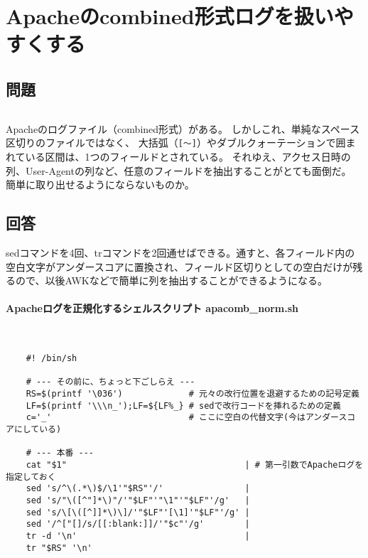 \section{Apacheのcombined形式ログを扱いやすくする}

\subsection*{問題}
\noindent
$\!\!\!\!\!$
\begin{grshfboxit}{160.0mm}
	Apacheのログファイル（combined形式）がある。
	しかしこれ、単純なスペース区切りのファイルではなく、
	大括弧（\verb|[～]|）やダブルクォーテーションで囲まれている区間は、1つのフィールドとされている。
	それゆえ、アクセス日時の列、User-Agentの列など、任意のフィールドを抽出することがとても面倒だ。
	簡単に取り出せるようにならないものか。
\end{grshfboxit}

\subsection*{回答}
sedコマンドを4回、trコマンドを2回通せばできる。通すと、各フィールド内の空白文字がアンダースコアに置換され、フィールド区切りとしての空白だけが残るので、以後AWKなどで簡単に列を抽出することができるようになる。

\paragraph{Apacheログを正規化するシェルスクリプト apacomb\_{}norm.sh} 　\\
\begin{frameboxit}{160.0mm}
\begin{verbatim}
	#! /bin/sh

	# --- その前に、ちょっと下ごしらえ ---
	RS=$(printf '\036')             # 元々の改行位置を退避するための記号定義
	LF=$(printf '\\\n_');LF=${LF%_} # sedで改行コードを挿れるための定義
	c='_'                           # ここに空白の代替文字(今はアンダースコアにしている)

	# --- 本番 ---
	cat "$1"                                   | # 第一引数でApacheログを指定しておく
	sed 's/^\(.*\)$/\1'"$RS"'/'                |
	sed 's/"\([^"]*\)"/'"$LF"'"\1"'"$LF"'/g'   |
	sed 's/\[\([^]]*\)\]/'"$LF"'[\1]'"$LF"'/g' |
	sed '/^["[]/s/[[:blank:]]/'"$c"'/g'        |
	tr -d '\n'                                 |
	tr "$RS" '\n'
\end{verbatim}
\end{frameboxit}

